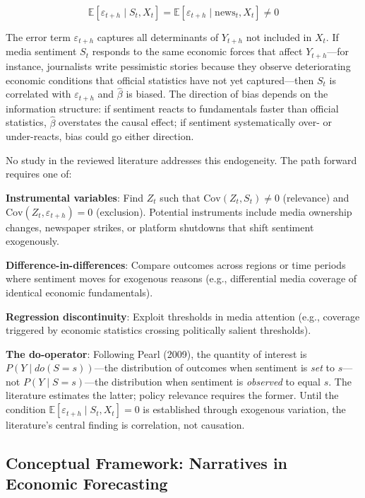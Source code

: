 \documentclass[11pt]{article}
\begin{document}
\begin{equation}
\mathbb{E}[\varepsilon_{t+h} \mid S_t, X_t] = \mathbb{E}[\varepsilon_{t+h} \mid \text{news}_t, X_t] \neq 0
\label{eq:endog}
\end{equation}

The error term $\varepsilon_{t+h}$ captures all determinants of $Y_{t+h}$ not included in $X_t$. If media sentiment $S_t$ responds to the same economic forces that affect $Y_{t+h}$---for instance, journalists write pessimistic stories because they observe deteriorating economic conditions that official statistics have not yet captured---then $S_t$ is correlated with $\varepsilon_{t+h}$ and $\hat{\beta}$ is biased. The direction of bias depends on the information structure: if sentiment reacts to fundamentals faster than official statistics, $\hat{\beta}$ overstates the causal effect; if sentiment systematically over- or under-reacts, bias could go either direction.

No study in the reviewed literature addresses this endogeneity. The path forward requires one of:

\noindent\textbf{Instrumental variables}: Find $Z_t$ such that $\text{Cov}(Z_t, S_t) \neq 0$ (relevance) and $\text{Cov}(Z_t, \varepsilon_{t+h}) = 0$ (exclusion). Potential instruments include media ownership changes, newspaper strikes, or platform shutdowns that shift sentiment exogenously.

\noindent\textbf{Difference-in-differences}: Compare outcomes across regions or time periods where sentiment moves for exogenous reasons (e.g., differential media coverage of identical economic fundamentals).

\noindent\textbf{Regression discontinuity}: Exploit thresholds in media attention (e.g., coverage triggered by economic statistics crossing politically salient thresholds).

\noindent\textbf{The do-operator}: Following Pearl (2009), the quantity of interest is $P(Y \mid do(S = s))$---the distribution of outcomes when sentiment is \emph{set} to $s$---not $P(Y \mid S = s)$---the distribution when sentiment is \emph{observed} to equal $s$. The literature estimates the latter; policy relevance requires the former. Until the condition $\mathbb{E}[\varepsilon_{t+h} \mid S_t, X_t] = 0$ is established through exogenous variation, the literature's central finding is correlation, not causation.

\subsection{Conceptual Framework: Narratives in Economic Forecasting}
\end{document}
